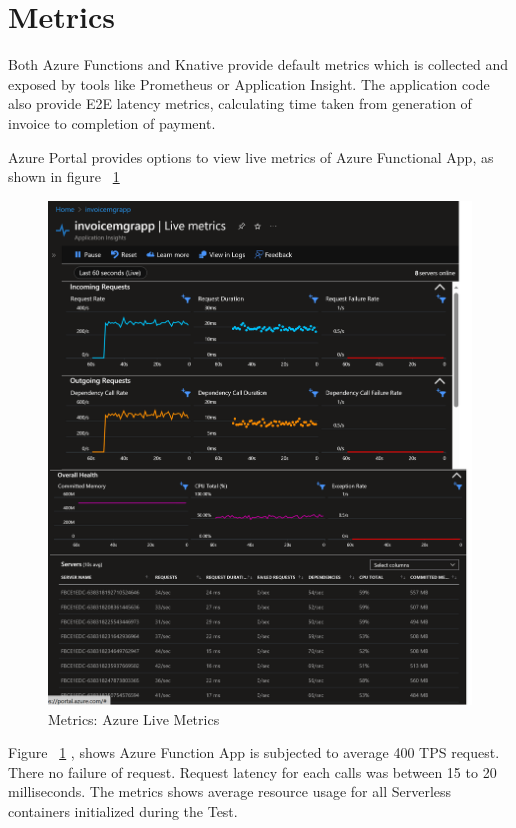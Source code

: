 \documentclass{article}
\begin{document}
\section{Metrics}
\begin{flushleft}
Both Azure Functions and Knative provide default metrics which is collected and exposed by tools like Prometheus or Application Insight. The application code also provide E2E latency metrics, calculating time taken from generation of invoice to completion of payment. 
\par
Azure Portal provides options to view live metrics of Azure Functional App, as shown in figure ~\ref{azure_live_metrics}

\begin{figure}[h]
    \centering
    \includegraphics[scale=0.5]{images/AzurePerfCapture/liveMetrics.png}
    \caption{Metrics: Azure Live Metrics}
    \label{azure_live_metrics}
\end{figure}
\pagebreak
\par
Figure ~\ref{azure_live_metrics} , shows Azure Function App is subjected to average 400 TPS request. There no failure of request. Request latency for each calls was between 15 to 20 milliseconds.
\hfill \break
The metrics shows average resource usage for all Serverless containers initialized during the Test.
\break


\end{flushleft}
\end{document}
